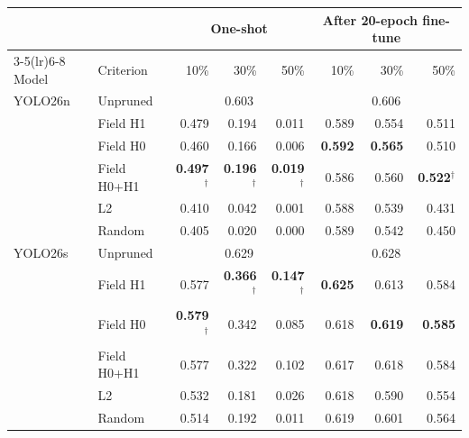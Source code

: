 \begin{tabular}{llrrrrrr}
\toprule
 & & \multicolumn{3}{c}{One-shot} & \multicolumn{3}{c}{After 20-epoch fine-tune} \\
\cmidrule(lr){3-5}\cmidrule(lr){6-8}
Model & Criterion & 10\% & 30\% & 50\% & 10\% & 30\% & 50\% \\
\midrule
YOLO26n & Unpruned & \multicolumn{3}{c}{0.603} & \multicolumn{3}{c}{0.606} \\
 & Field H1 & 0.479 & 0.194 & 0.011 & 0.589 & 0.554 & 0.511 \\
 & Field H0 & 0.460 & 0.166 & 0.006 & \textbf{0.592} & \textbf{0.565} & 0.510 \\
 & Field H0+H1 & \textbf{0.497}$^\dagger$ & \textbf{0.196}$^\dagger$ & \textbf{0.019}$^\dagger$ & 0.586 & 0.560 & \textbf{0.522}$^\dagger$ \\
 & L2 & 0.410 & 0.042 & 0.001 & 0.588 & 0.539 & 0.431 \\
 & Random & 0.405 & 0.020 & 0.000 & 0.589 & 0.542 & 0.450 \\
\midrule
YOLO26s & Unpruned & \multicolumn{3}{c}{0.629} & \multicolumn{3}{c}{0.628} \\
 & Field H1 & 0.577 & \textbf{0.366}$^\dagger$ & \textbf{0.147}$^\dagger$ & \textbf{0.625} & 0.613 & 0.584 \\
 & Field H0 & \textbf{0.579}$^\dagger$ & 0.342 & 0.085 & 0.618 & \textbf{0.619} & \textbf{0.585} \\
 & Field H0+H1 & 0.577 & 0.322 & 0.102 & 0.617 & 0.618 & 0.584 \\
 & L2 & 0.532 & 0.181 & 0.026 & 0.618 & 0.590 & 0.554 \\
 & Random & 0.514 & 0.192 & 0.011 & 0.619 & 0.601 & 0.564 \\
\bottomrule
\end{tabular}
